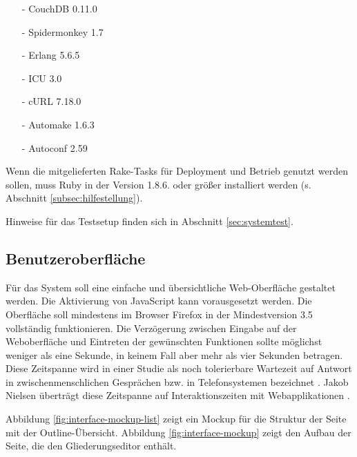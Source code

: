 \begin{itemize}  
  \item[-] CouchDB 0.11.0
  \item[-] Spidermonkey 1.7
  \item[-] Erlang 5.6.5
  \item[-] ICU 3.0
  \item[-] cURL 7.18.0
  \item[-] Automake 1.6.3
  \item[-] Autoconf 2.59
\end{itemize}

Wenn die mitgelieferten Rake-Tasks für Deployment und Betrieb genutzt werden sollen, muss Ruby in der Version 1.8.6. oder größer installiert werden (s. Abschnitt \ref{subsec:hilfestellung}).

Hinweise für das Testsetup finden sich in Abschnitt \ref{sec:systemtest}.


\subsection{Benutzeroberfläche}
\label{subsec:gui-anf}

Für das System soll eine einfache und übersichtliche Web-Oberfläche gestaltet werden. Die Aktivierung von JavaScript kann vorausgesetzt werden. Die Oberfläche soll mindestens im Browser Firefox in der Mindestversion 3.5 vollständig funktionieren. Die Verzögerung zwischen Eingabe auf der Weboberfläche und Eintreten der gewünschten Funktionen sollte möglichst weniger als eine Sekunde, in keinem Fall aber mehr als vier Sekunden betragen. Diese Zeitspanne wird in einer Studie als noch tolerierbare Wartezeit auf Antwort in zwischenmenschlichen Gesprächen bzw. in Telefonsystemen bezeichnet . Jakob Nielsen überträgt diese Zeitspanne auf Interaktionszeiten mit Webapplikationen .

Abbildung \ref{fig:interface-mockup-list} zeigt ein Mockup für die Struktur der Seite mit der Outline-Übersicht. Abbildung \ref{fig:interface-mockup} zeigt den Aufbau der Seite, die den Gliederungseditor enthält.


